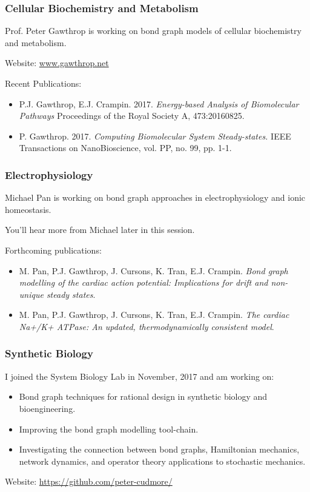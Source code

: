 \documentclass[11pt,reqno]{beamer}
\begin{document}
\begin{frame}
\frametitle{Cellular Biochemistry and Metabolism}

Prof. Peter Gawthrop is working on bond graph models of cellular biochemistry and metabolism.\\
\vspace{10pt}

Website: \url{www.gawthrop.net}
\vspace{10pt}

Recent Publications:
\begin{itemize}
	\itemsep1em
	\item  P.J. Gawthrop, E.J. Crampin. 2017. \emph{Energy-based Analysis of Biomolecular Pathways}
	Proceedings of the Royal Society A, 473:20160825.
	\item P. Gawthrop. 2017. \emph{Computing Biomolecular System Steady-states.}
	 IEEE Transactions on NanoBioscience, vol. PP, no. 99, pp. 1-1. 
\end{itemize}


\end{frame}
\begin{frame}
\frametitle{Electrophysiology}
Michael Pan is working on bond graph approaches in electrophysiology and ionic homeostasis. \\
\vspace{10pt}

You'll hear more from Michael later in this session.\\
\vspace{10pt}

Forthcoming publications:
\begin{itemize}
	\itemsep1em
	\item M. Pan, P.J. Gawthrop, J. Cursons, K. Tran, E.J. Crampin. \emph{Bond graph modelling of the cardiac action potential: Implications for drift and non-unique steady states}.
	\item M. Pan, P.J. Gawthrop, J. Cursons, K. Tran, E.J. Crampin.
	\emph{The cardiac Na+/K+ ATPase: An updated, thermodynamically consistent model}.
\end{itemize}
\end{frame}
\begin{frame}
\frametitle{Synthetic Biology}
I joined the System Biology Lab in November, 2017 and am working on:
\begin{itemize}
	\itemsep1em
	\item Bond graph techniques for rational design in synthetic biology and bioengineering.
	\item Improving the bond graph modelling tool-chain. 
	\item Investigating the connection between bond graphs, Hamiltonian mechanics, network dynamics, and operator theory applications to stochastic mechanics.
\end{itemize}
\vspace{10pt}


Website: \url{https://github.com/peter-cudmore/}

\end{frame}
\end{document}
